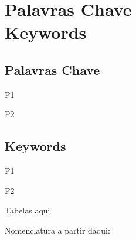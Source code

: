 \newpage
\thispagestyle{empty}


\chapter*{Palavras Chave \\ Keywords}
\thispagestyle{empty}

\section*{Palavras Chave}
{\large

\noindent P1

\noindent P2

}

\section*{Keywords}

{\large

\noindent P1

\noindent P2

}

\newpage
\thispagestyle{empty}

\cleardoublepage



\tableofcontents
\newpage

\listoffigures
\newpage

\listoftables
Tabelas aqui
\newpage

Nomenclatura a partir daqui:
\printnomenclature
\cleardoublepage



